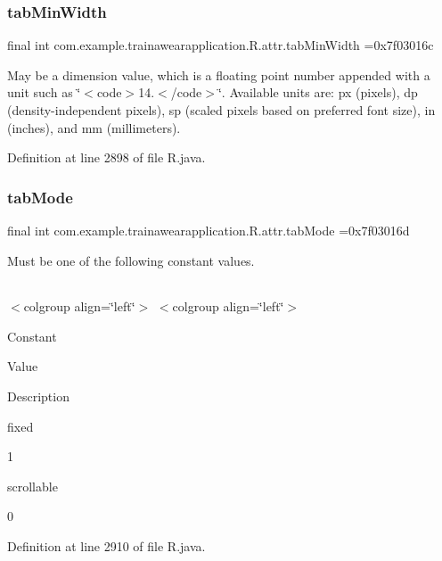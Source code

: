 \subsubsection{\texorpdfstring{tabMinWidth}{tabMinWidth}}
{\footnotesize\ttfamily final int com.\+example.\+trainawearapplication.\+R.\+attr.\+tab\+Min\+Width =0x7f03016c\hspace{0.3cm}{\ttfamily [static]}}

May be a dimension value, which is a floating point number appended with a unit such as \char`\"{}$<$code$>$14.\+5sp$<$/code$>$\char`\"{}. Available units are\+: px (pixels), dp (density-\/independent pixels), sp (scaled pixels based on preferred font size), in (inches), and mm (millimeters). 

Definition at line 2898 of file R.\+java.

\mbox{\label{classcom_1_1example_1_1trainawearapplication_1_1_r_1_1attr_ae946956afe3fac2b38e6db110301fa35}} 
\subsubsection{\texorpdfstring{tabMode}{tabMode}}
{\footnotesize\ttfamily final int com.\+example.\+trainawearapplication.\+R.\+attr.\+tab\+Mode =0x7f03016d\hspace{0.3cm}{\ttfamily [static]}}

Must be one of the following constant values.

\tabulinesep=1mm
\begin{longtabu}spread 0pt [c]{*{0}{|X[-1]}|}
\hline
\end{longtabu}
$<$colgroup align=\char`\"{}left\char`\"{}$>$ $<$colgroup align=\char`\"{}left\char`\"{}$>$ 

Constant

Value

Description 

fixed

1

scrollable

0

Definition at line 2910 of file R.\+java.

\mbox{\label{classcom_1_1example_1_1trainawearapplication_1_1_r_1_1attr_ae63de6153dcc2a0eabf0ee8bda16d1bd}} 
